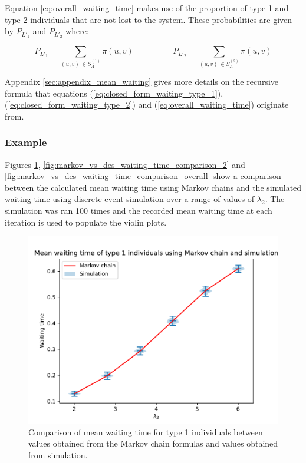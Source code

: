 Equation \ref{eq:overall_waiting_time} makes use of the proportion of type 1 
and type 2 individuals that are not lost to the system. These probabilities are 
given by \(P_{L'_1}\) and \(P_{L'_2}\) where:

\begin{equation}\label{eq:proportion_of_accepting_individuals}
    P_{L'_1} = \sum_{(u,v) \, \in S_A^{(1)}} \pi(u,v) \hspace{2cm}
    P_{L'_2} = \sum_{(u,v) \, \in S_A^{(2)}} \pi(u,v)
\end{equation}
 
Appendix \ref{sec:appendix_mean_waiting} gives more details on the recursive
formula that equations (\ref{eq:closed_form_waiting_type_1}),
(\ref{eq:closed_form_waiting_type_2}) and (\ref{eq:overall_waiting_time})
originate from. 

\subsubsection{Example}
Figures \ref{fig:markov_vs_des_waiting_time_comparison_1},
\ref{fig:markov_vs_des_waiting_time_comparison_2} and
\ref{fig:markov_vs_des_waiting_time_comparison_overall} show a comparison 
between the calculated mean waiting time using Markov chains and the simulated 
waiting time using discrete event simulation over a range of values of 
\(\lambda_2\).
The simulation was ran 100 times and the recorded mean waiting time at each 
iteration is used to populate the violin plots.

\begin{figure}[H]
    \centering
    \includegraphics[width=.8\textwidth]{imgs/waiting_time_comparison/waiting_1.pdf}
    \caption{
        Comparison of mean waiting time for type 1 individuals between values 
        obtained from the Markov chain formulas and values obtained from 
        simulation.
    }
    \label{fig:markov_vs_des_waiting_time_comparison_1}
\end{figure}

